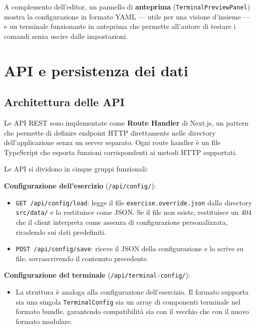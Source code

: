 A complemento dell'editor, un pannello di \textbf{anteprima} (\texttt{TerminalPreviewPanel}) mostra la configurazione in formato YAML --- utile per una visione d'insieme --- e un terminale funzionante in anteprima che permette all'autore di testare i comandi senza uscire dalle impostazioni.



\section{API e persistenza dei dati}
\label{sec:api-persistenza}

\subsection{Architettura delle API}
\label{subsec:architettura-api}

Le API REST sono implementate come \textbf{Route Handler} di Next.js, un pattern che permette di definire endpoint HTTP direttamente nelle directory dell'applicazione senza un server separato. Ogni route handler è un file TypeScript che esporta funzioni corrispondenti ai metodi HTTP supportati.

Le API si dividono in cinque gruppi funzionali:

\textbf{Configurazione dell'esercizio} (\texttt{/api/config/}):
\begin{itemize}
    \item \texttt{GET /api/config/load}: legge il file \texttt{exercise.override.json} dalla directory \texttt{src/data/} e lo restituisce come JSON. Se il file non esiste, restituisce un 404 che il client interpreta come assenza di configurazione personalizzata, ricadendo sui dati predefiniti.
    \item \texttt{POST /api/config/save}: riceve il JSON della configurazione e lo scrive su file, sovrascrivendo il contenuto precedente.
\end{itemize}

\textbf{Configurazione del terminale} (\texttt{/api/terminal-config/}):
\begin{itemize}
    \item La struttura è analoga alla configurazione dell'esercizio. Il formato supporta sia una singola \texttt{TerminalConfig} sia un array di componenti terminale nel formato bundle, garantendo compatibilità sia con il vecchio che con il nuovo formato modulare.
\end{itemize}

